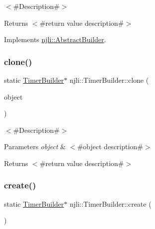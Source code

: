 $<$\#\+Description\#$>$

\begin{DoxyReturn}{Returns}
$<$\#return value description\#$>$ 
\end{DoxyReturn}


Implements \mbox{\hyperlink{classnjli_1_1_abstract_builder_aa1d220053e182c37b31b427499c6eacf}{njli\+::\+Abstract\+Builder}}.

\mbox{\label{classnjli_1_1_timer_builder_a9277607c63adf64e917626ff30aaf3ac}} 
\subsubsection{\texorpdfstring{clone()}{clone()}}
{\footnotesize\ttfamily static \mbox{\hyperlink{classnjli_1_1_timer_builder}{Timer\+Builder}}$\ast$ njli\+::\+Timer\+Builder\+::clone (\begin{DoxyParamCaption}\item[{const \mbox{\hyperlink{classnjli_1_1_timer_builder}{Timer\+Builder}} \&}]{object }\end{DoxyParamCaption})\hspace{0.3cm}{\ttfamily [static]}}

$<$\#\+Description\#$>$


\begin{DoxyParams}{Parameters}
{\em object} & $<$\#object description\#$>$\\
\hline
\end{DoxyParams}
\begin{DoxyReturn}{Returns}
$<$\#return value description\#$>$ 
\end{DoxyReturn}
\mbox{\label{classnjli_1_1_timer_builder_aa867a59bcb49a6af4a26b4f384a01f20}} 
\subsubsection{\texorpdfstring{create()}{create()}}
{\footnotesize\ttfamily static \mbox{\hyperlink{classnjli_1_1_timer_builder}{Timer\+Builder}}$\ast$ njli\+::\+Timer\+Builder\+::create (\begin{DoxyParamCaption}{ }\end{DoxyParamCaption})\hspace{0.3cm}{\ttfamily [static]}}

